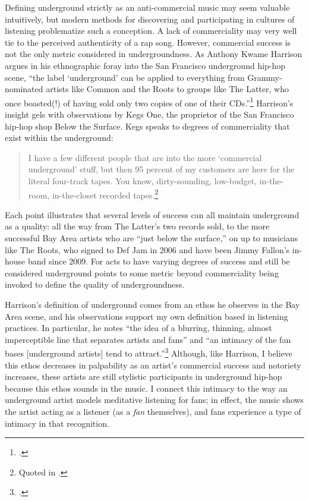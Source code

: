 Defining underground strictly as an anti-commercial music may seem valuable intuitively, but 
modern methods for discovering and participating in cultures of listening problematize such a
conception. A lack of commerciality may very well tie to the perceived authenticity of a rap
song. However, commercial success is not the only metric considered in undergroundness. As Anthony
Kwame Harrison argues in his ethnographic foray into the San Francisco underground hip-hop scene, 
``the label `underground' can be applied to everything from Grammy-nominated artists like Common 
and the Roots to groups like The Latter, who once boasted(!) of having sold only two copies of one
of their CDs.''\footnote{
    \autocite[9]{anthonykwameharrisonHipHopUnderground2009}.}
Harrison's insight gels with observations by Kegs One, the proprietor of the San  Francisco 
hip-hop shop Below the Surface. Kegs speaks to degrees of commerciality that exist within 
the underground:
    \begin{quote}
        I have a few different people that are into the more `commercial underground' stuff, 
        but then 95 percent of my customers are here for the  literal four-track tapes. You 
        know,  dirty-sounding, low-budget, in-the-room, in-the-closet recorded 
        tapes.\footnote{
            Quoted in \autocite[10]{anthonykwameharrisonHipHopUnderground2009}.}
    \end{quote}
Each point illustrates that several levels of success can all maintain underground as a quality:
all the way from The Latter's two records sold, to the more successful Bay Area artists who are
``just below the surface,'' on up to  musicians like The Roots, who signed to Def Jam in 2006 
and  have been Jimmy Fallon's in-house band since 2009. For acts to have varying degrees of success 
and still be considered underground points to some metric beyond commerciality being invoked to 
define the quality of undergroundness.

Harrison's definition of underground comes from an ethos he observes in the Bay Area scene, and his 
observations support my own definition based in listening practices. In particular, he notes
``the idea of a blurring, thinning, almost imperceptible line that separates artists and fans'' and
``an intimacy of the fan bases [underground artists] tend to attract.''\footnote{
    \autocite[10--11]{anthonykwameharrisonHipHopUnderground2009}.}
Although, like Harrison, I believe this ethos decreases in palpability as an artist's commercial 
success and notoriety increases, these artists are still stylistic participants in underground 
hip-hop because this ethos sounds in the music. I connect this intimacy to the way an underground
artist models meditative listening for fans; in effect, the music shows the artist acting as a 
listener (as a \emph{fan} themselves), and fans experience a type of intimacy in that recognition.

